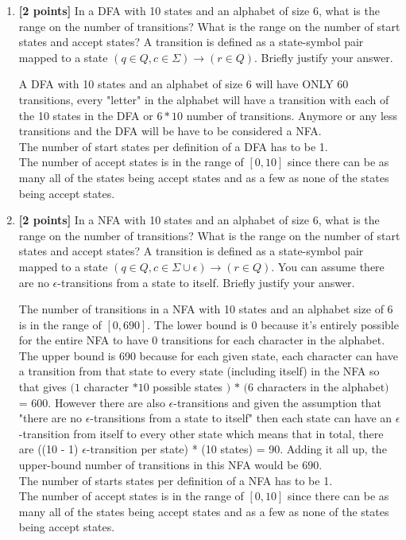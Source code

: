 \documentclass[11pt]{article}
\theoremstyle{definition}
\theoremstyle{theorem}
\newcommand{\solution}{\medskip\noindent{\color{blue}\textbf{Solution:}}}
\begin{document}
\begin{enumerate}[label=(\alph*)]

\item \textbf{[2 points]}   In a DFA with 10 states and an alphabet of size 6, what is the range on the number of transitions? What is the range on the number of start states and accept states? A transition is defined as a state-symbol pair mapped to a state $(q \in Q, c \in \Sigma) \rightarrow (r \in Q)$. Briefly justify your answer.

\solution

A DFA with 10 states and an alphabet of size 6 will have ONLY 60 transitions, every "letter" in the alphabet will have a transition with each of the 10 states in the DFA or $6 * 10$ number of transitions. Anymore or any less transitions and the DFA will be have to be considered a NFA.
\\[3ex] The number of start states per definition of a DFA has to be 1.
\\[3ex] The number of accept states is in the range of $[0, 10]$ since there can be as many all of the states being accept states and as a few as none of the states being accept states.


\item \textbf{[2 points]}    In a NFA with 10 states and an alphabet of size 6, what is the range on the number of transitions? What is the range on the number of start states and accept states? A transition is defined as a state-symbol pair mapped to a state $(q \in Q, c \in \Sigma \cup \epsilon) \rightarrow (r \in Q)$. You can assume there are no $\epsilon$-transitions from a state to itself. Briefly justify your answer.


\solution

The number of transitions in a NFA with 10 states and an alphabet size of 6 is in the range of $[0, 690]$. The lower bound is 0 because it's entirely possible for the entire NFA to have 0 transitions for each character in the alphabet.
The upper bound is 690 because for each given state, each character can have a transition from that state to every state (including itself) in the NFA so that gives $(1$ character $* 10$ possible states $)$ $*$ $(6$ characters in the alphabet$)$ = 600.
However there are also $\epsilon$-transitions and given the assumption that "there are no $\epsilon$-transitions from a state to itself" then each state can have an $\epsilon$-transition from itself to every other state which means that in total, there are ((10 - 1) $\epsilon$-transition per state) * (10 states) = 90.
Adding it all up, the upper-bound number of transitions in this NFA would be $690$.
\\[3ex] The number of starts states per definition of a NFA has to be 1.
\\[3ex] The number of accept states is in the range of $[0, 10]$ since there can be as many all of the states being accept states and as a few as none of the states being accept states.


\end{enumerate}
\end{document}
